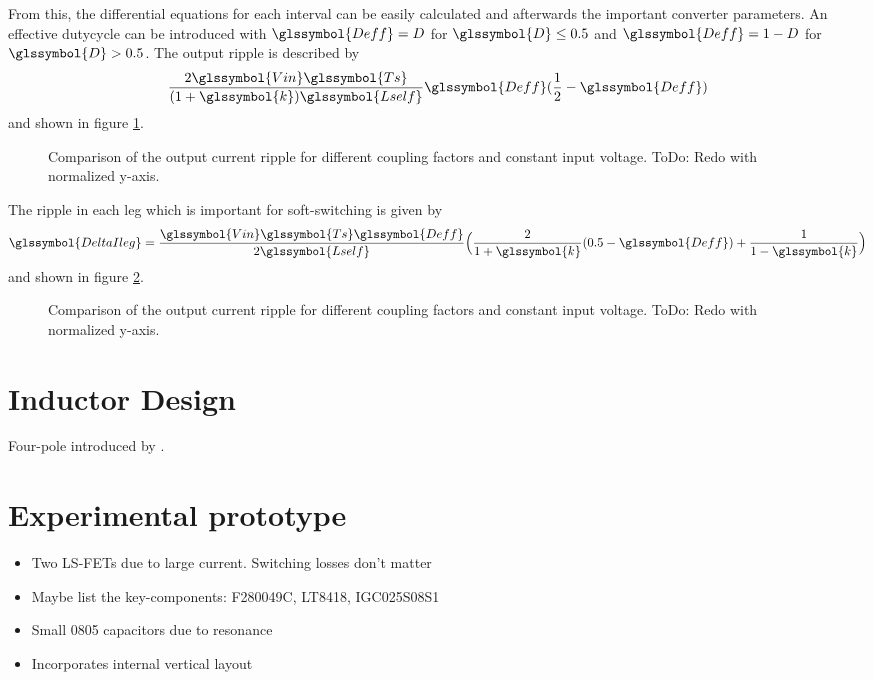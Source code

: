\documentclass{IPEC2026}
\newcommand{\sbl}[1]{\glssymbol{#1}}
\begin{document}
From this, the differential equations for each interval can be easily calculated and afterwards the important converter parameters. An effective dutycycle \sbl{Deff} can be introduced with $\sbl{Deff} = D$ for $\sbl{D} \leq 0.5$ and $\sbl{Deff} = 1-D$ for $\sbl{D} > 0.5$.
The output ripple is described by
\begin{equation}
  \frac{2\sbl{Vin}\sbl{Ts}}{(1+\sbl{k})\sbl{Lself}}\sbl{Deff}(\frac{1}{2}-\sbl{Deff})
\end{equation}
and shown in figure \ref{fig:OutputRipple}.
\begin{figure}
  \centering
  
  \caption{Comparison of the output current ripple for different coupling factors and constant input voltage. ToDo: Redo with normalized y-axis.}
  \label{fig:OutputRipple}
\end{figure}

The ripple in each leg which is important for soft-switching is given by
\begin{equation}
  \sbl{DeltaIleg} =  \frac{\sbl{Vin}\sbl{Ts}\sbl{Deff}}{2\sbl{Lself}} \Bigl (\frac{2}{1+\sbl{k}}(0.5-\sbl{Deff}) + \frac{1}{1-\sbl{k}} \Bigr )  
\end{equation}
and shown in figure \ref{fig:LegRipple}.

\begin{figure}
  \centering
  
  \caption{Comparison of the output current ripple for different coupling factors and constant input voltage. ToDo: Redo with normalized y-axis.}
  \label{fig:LegRipple}
\end{figure}

\section{Inductor Design}
Four-pole introduced by  \cite{huaUltrathinCoupledInductor2021}. 

\section{Experimental prototype}
\begin{itemize}
    \item Two LS-FETs due to large current. Switching losses don't matter
    \item Maybe list the key-components: F280049C, LT8418, IGC025S08S1
    \item Small 0805 capacitors due to resonance
    \item Incorporates internal vertical layout
\end{itemize}
\end{document}
